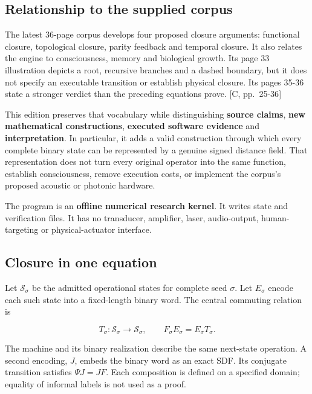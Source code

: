 \documentclass[11pt,a4paper]{article}
\begin{document}
\subsection{Relationship to the supplied
corpus}\label{relationship-to-the-supplied-corpus}

The latest 36-page corpus develops four proposed closure arguments:
functional closure, topological closure, parity feedback and temporal
closure. It also relates the engine to consciousness, memory and
biological growth. Its page 33 illustration depicts a root, recursive
branches and a dashed boundary, but it does not specify an executable
transition or establish physical closure. Its pages 35-36 state a
stronger verdict than the preceding equations prove. {[}C, pp.~25-36{]}

This edition preserves that vocabulary while distinguishing
\textbf{source claims}, \textbf{new mathematical constructions},
\textbf{executed software evidence} and \textbf{interpretation}. In
particular, it adds a valid construction through which every complete
binary state can be represented by a genuine signed distance field. That
representation does not turn every original operator into the same
function, establish consciousness, remove execution costs, or implement
the corpus's proposed acoustic or photonic hardware.

The program is an \textbf{offline numerical research kernel}. It writes
state and verification files. It has no transducer, amplifier, laser,
audio-output, human-targeting or physical-actuator interface.

\subsection{Closure in one equation}\label{closure-in-one-equation}

Let \(\mathcal S_\sigma\) be the admitted operational states for
complete seed \(\sigma\). Let \(E_\sigma\) encode each such state into a
fixed-length binary word. The central commuting relation is

\[
\boxed{\quad T_\sigma:\mathcal S_\sigma\to\mathcal S_\sigma,
\qquad F_\sigma E_\sigma=E_\sigma T_\sigma.\quad}
\]

The machine and its binary realization describe the same next-state
operation. A second encoding, \(J\), embeds the binary word as an exact
SDF. Its conjugate transition satisfies \(\Psi J=JF\). Each composition
is defined on a specified domain; equality of informal labels is not
used as a proof.
\end{document}
